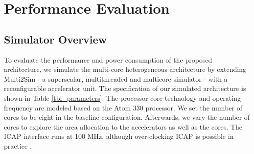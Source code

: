 \begin{flushright}

\end{flushright}\section{Performance Evaluation}
\label{sec_perf}
 

\subsection{Simulator Overview}
To evaluate the performance and power consumption of the proposed
architecture, we simulate the multi-core heterogeneous architecture
by extending Multi2Sim - a superscalar, multithreaded and multicore
simulator - with a reconfigurable accelerator unit. 
 The specification of our simulated architecture is shown in Table
\ref{tbl_parameters}. The processor core technology and operating
frequency are modeled based on the Atom 330 processor. We set the
number of cores to be eight in the baseline configuration. Afterwards, we vary the
number of cores to explore the area allocation to the accelerators as well as the cores. 
The ICAP interface runs at 100 MHz, although over-clocking ICAP is
possible in practice \cite{Hansen:2011dt}.

